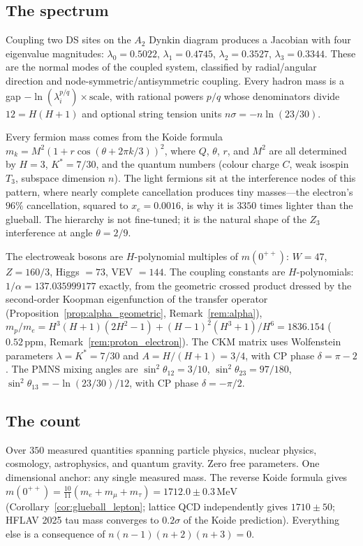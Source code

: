 \documentclass[11pt,a4paper]{article}
\theoremstyle{definition}
\theoremstyle{remark}
\begin{document}
\subsection*{The spectrum}

Coupling two DS sites on the $A_2$ Dynkin diagram produces a Jacobian with four eigenvalue magnitudes: $\lambda_0=0.5022$, $\lambda_1=0.4745$, $\lambda_2=0.3527$, $\lambda_3=0.3344$. These are the normal modes of the coupled system, classified by radial/angular direction and node-symmetric/antisymmetric coupling. Every hadron mass is a gap $-\ln(\lambda_i^{p/q})\times\text{scale}$, with rational powers $p/q$ whose denominators divide $12=H(H+1)$ and optional string tension units $n\sigma=-n\ln(23/30)$.

Every fermion mass comes from the Koide formula $m_k=M^2(1+r\cos(\theta+2\pi k/3))^2$, where $Q$, $\theta$, $r$, and $M^2$ are all determined by $H=3$, $K^*=7/30$, and the quantum numbers (colour charge $C$, weak isospin $T_3$, subspace dimension $n$). The light fermions sit at the interference nodes of this pattern, where nearly complete cancellation produces tiny masses---the electron's $96\%$ cancellation, squared to $x_e=0.0016$, is why it is $3350$ times lighter than the glueball. The hierarchy is not fine-tuned; it is the natural shape of the $Z_3$ interference at angle $\theta=2/9$.

The electroweak bosons are $H$-polynomial multiples of $m(0^{++})$: $W=47$, $Z=160/3$, Higgs $=73$, VEV $=144$. The coupling constants are $H$-polynomials: $1/\alpha=137.035999177$ exactly, from the geometric crossed product dressed by the second-order Koopman eigenfunction of the transfer operator (Proposition~\ref{prop:alpha_geometric}, Remark~\ref{rem:alpha}), $m_p/m_e=H^3(H+1)(2H^2-1)+(H-1)^2(H^3+1)/H^6=1836.154$ ($0.52\,\mathrm{ppm}$, Remark~\ref{rem:proton_electron}). The CKM matrix uses Wolfenstein parameters $\lambda=K^*=7/30$ and $A=H/(H+1)=3/4$, with CP phase $\delta=\pi-2$. The PMNS mixing angles are $\sin^2\theta_{12}=3/10$, $\sin^2\theta_{23}=97/180$, $\sin^2\theta_{13}=-\ln(23/30)/12$, with CP phase $\delta=-\pi/2$.

\subsection*{The count}

Over $350$ measured quantities spanning particle physics, nuclear physics, cosmology, astrophysics, and quantum gravity. Zero free parameters. One dimensional anchor: any single measured mass. The reverse Koide formula gives $m(0^{++})=\tfrac{10}{11}(m_e+m_\mu+m_\tau)=1712.0\pm 0.3\,\mathrm{MeV}$ (Corollary~\ref{cor:glueball_lepton}; lattice QCD independently gives $1710\pm 50$; HFLAV 2025 tau mass converges to $0.2\sigma$ of the Koide prediction). Everything else is a consequence of $n(n-1)(n+2)(n+3)=0$.
\end{document}
